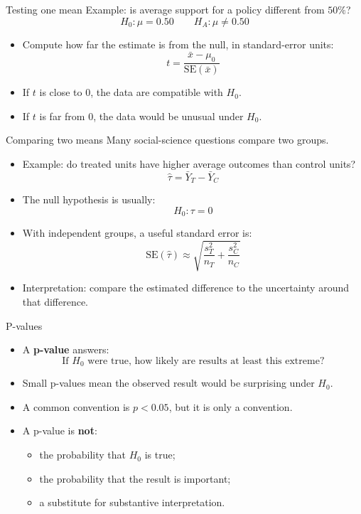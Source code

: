 \documentclass[aspectratio=169]{beamer}
\begin{document}
\begin{frame}{Testing one mean}
    Example: is average support for a policy different from \(50\%\)?
    \[
        H_0: \mu = 0.50
        \qquad
        H_A: \mu \neq 0.50
    \]

    \begin{itemize}
        \item Compute how far the estimate is from the null, in standard-error units:
        \[
            t = \frac{\bar{x} - \mu_0}{\mathrm{SE}(\bar{x})}
        \]
        \item If \(t\) is close to \(0\), the data are compatible with \(H_0\).
        \item If \(t\) is far from \(0\), the data would be unusual under \(H_0\).
    \end{itemize}
\end{frame}

\begin{frame}{Comparing two means}
    Many social-science questions compare two groups.
    \vspace{0.2cm}

    \begin{itemize}
        \item Example: do treated units have higher average outcomes than control units?
        \[
            \widehat{\tau} = \bar{Y}_{T} - \bar{Y}_{C}
        \]
        \item The null hypothesis is usually:
        \[
            H_0: \tau = 0
        \]
        \item With independent groups, a useful standard error is:
        \[
            \mathrm{SE}(\widehat{\tau}) \approx \sqrt{\frac{s_T^2}{n_T} + \frac{s_C^2}{n_C}}
        \]
        \item Interpretation: compare the estimated difference to the uncertainty around that difference.
    \end{itemize}
\end{frame}

\begin{frame}{P-values}
    \begin{itemize}
        \item A \textbf{p-value} answers:
        \[
            \text{If \(H_0\) were true, how likely are results at least this extreme?}
        \]
        \item Small p-values mean the observed result would be surprising under \(H_0\).
        \item A common convention is \(p < 0.05\), but it is only a convention.
        \item A p-value is \textbf{not}:
        \begin{itemize}
            \item the probability that \(H_0\) is true;
            \item the probability that the result is important;
            \item a substitute for substantive interpretation.
        \end{itemize}
    \end{itemize}
\end{frame}
\end{document}
